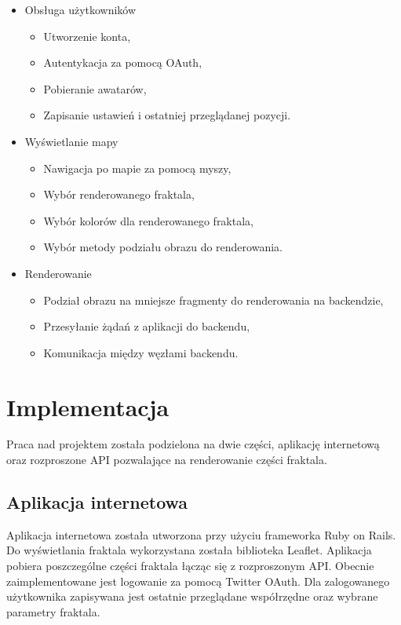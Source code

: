 \documentclass[wide,a4paper,titlepage,12pt]{article}
\begin{document}
\begin{itemize}
  \item Obsługa użytkowników
    \begin{itemize}
      \item Utworzenie konta,
      \item Autentykacja za pomocą OAuth,
      \item Pobieranie awatarów,
      \item Zapisanie ustawień i ostatniej przeglądanej pozycji.
    \end{itemize}
  \item Wyświetlanie mapy
    \begin{itemize}
      \item Nawigacja po mapie za pomocą myszy,
      \item Wybór renderowanego fraktala,
      \item Wybór kolorów dla renderowanego fraktala,
      \item Wybór metody podziału obrazu do renderowania.
    \end{itemize}
  \item Renderowanie
    \begin{itemize}
      \item Podział obrazu na mniejsze fragmenty do renderowania na backendzie,
      \item Przesyłanie żądań z aplikacji do backendu,
      \item Komunikacja między węzłami backendu.
    \end{itemize}
\end{itemize}

\section{Implementacja}

Praca nad projektem została podzielona na dwie części, aplikację internetową
oraz rozproszone API pozwalające na renderowanie części fraktala.

\subsection{Aplikacja internetowa}

Aplikacja internetowa została utworzona przy użyciu frameworka Ruby on Rails. Do
wyświetlania fraktala wykorzystana została biblioteka Leaflet. Aplikacja
pobiera poszczególne części fraktala łącząc się z rozproszonym API. Obecnie
zaimplementowane jest logowanie za pomocą Twitter OAuth. Dla zalogowanego
użytkownika zapisywana jest ostatnie przeglądane współrzędne oraz wybrane parametry fraktala.
\end{document}
